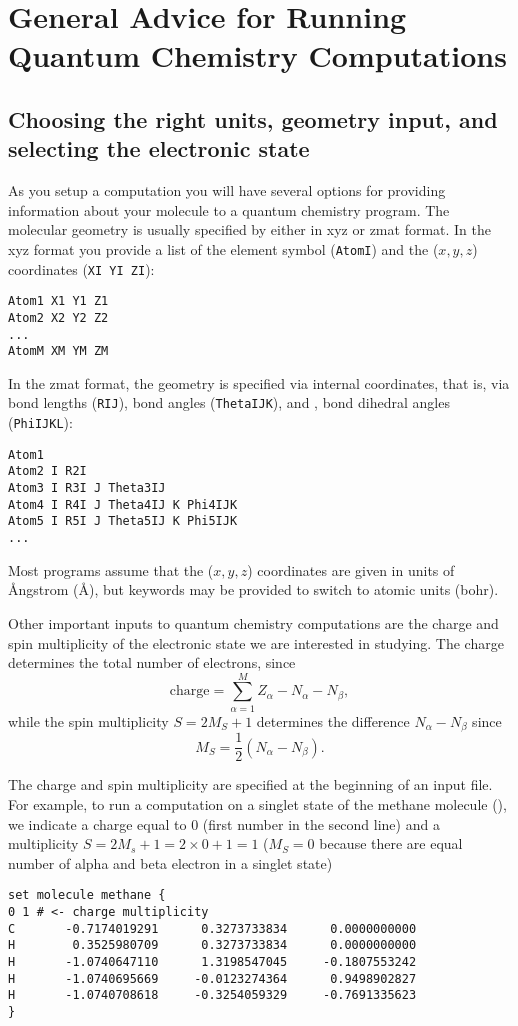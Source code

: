 \documentclass[../Main/chem532-notes.tex]{subfiles}
\begin{document}
\chapter{General Advice for Running Quantum Chemistry Computations}

\section{Choosing the right units, geometry input, and selecting the electronic state}

As you setup a computation you will have several options for providing information about your molecule to a quantum chemistry program.
The molecular geometry is usually specified by either in xyz or zmat format. In the xyz format you provide a list of the element symbol (\verb|AtomI|) and the ($x, y,z$) coordinates (\verb|XI YI ZI|):
\begin{verbatim}
Atom1 X1 Y1 Z1
Atom2 X2 Y2 Z2
...
AtomM XM YM ZM
\end{verbatim}
In the zmat format, the geometry is specified via internal coordinates, that is, via bond lengths (\verb|RIJ|), bond angles (\verb|ThetaIJK|), and , bond dihedral angles (\verb|PhiIJKL|):
\begin{verbatim}
Atom1
Atom2 I R2I 
Atom3 I R3I J Theta3IJ
Atom4 I R4I J Theta4IJ K Phi4IJK
Atom5 I R5I J Theta5IJ K Phi5IJK
...
\end{verbatim}
Most programs assume that the ($x,y,z$) coordinates are given in units of \AA{}ngstrom (\AA{}), but keywords may be provided to switch to atomic units (bohr).

Other important inputs to quantum chemistry computations are the charge and spin multiplicity of the electronic state we are interested in studying.
The charge determines the total number of electrons, since
\begin{equation}
\mathrm{charge} = \sum_{\alpha=1}^M Z_\alpha - N_\alpha - N_\beta,
\end{equation}
while the spin multiplicity $S = 2 M_S + 1$ determines the difference $N_\alpha - N_\beta$ since
\begin{equation}
M_S = \frac{1}{2} (N_\alpha - N_\beta).
\end{equation}

The charge and spin multiplicity are specified at the beginning of an input file. For example, to run a computation on a singlet state of the methane molecule (), we indicate a charge equal to 0 (first number in the second line) and a multiplicity $S= 2M_s + 1 = 2 \times 0 + 1 = 1$ ($M_S = 0$ because there are equal number of alpha and beta electron in a singlet state)
\begin{verbatim}
set molecule methane {
0 1 # <- charge multiplicity
C       -0.7174019291      0.3273733834      0.0000000000                 
H        0.3525980709      0.3273733834      0.0000000000                 
H       -1.0740647110      1.3198547045     -0.1807553242                 
H       -1.0740695669     -0.0123274364      0.9498902827                 
H       -1.0740708618     -0.3254059329     -0.7691335623     
}
\end{verbatim}
\end{document}
